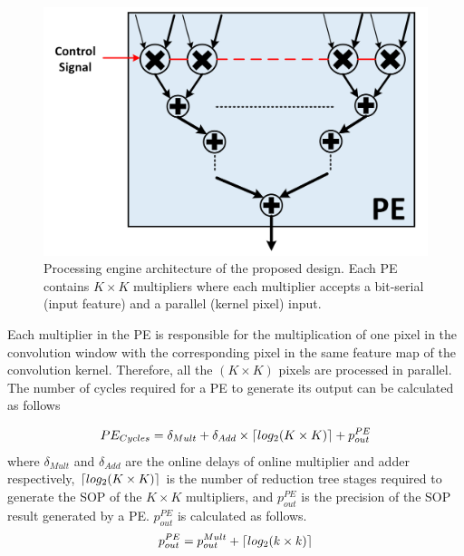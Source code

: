 \documentclass[conference]{IEEEtran}
\DeclarePairedDelimiter{\ceil}{\lceil}{\rceil}
\begin{document}
\begin{figure}[!htb]
    \centering
    \includegraphics[width=0.9\linewidth]{PE.png}
    \caption{Processing engine architecture of the proposed design. Each PE contains $K\times K$ multipliers where each multiplier accepts a bit-serial (input feature) and a parallel (kernel pixel) input.}
    \label{fig:PE}
\end{figure}


 
Each multiplier in the PE is responsible for the multiplication of one pixel in the convolution window with the corresponding pixel in the same feature map of the convolution kernel. Therefore, all the $(K \times K)$ pixels are processed in parallel. The number of cycles required for a PE to generate its output can be calculated as follows

\begin{equation} \label{eq: num_cycles}
        PE_{Cycles} = \delta_{Mult} + \delta_{Add} \times \ceil{log_{2}(K \times K)} + p^{PE}_{out}
\end{equation}
where $\delta_{Mult}$ and $\delta_{Add}$ are the online delays of online multiplier and adder respectively, $\ceil{log_{2}(K \times K)}$ is the number of reduction tree stages required to generate the SOP of the $K \times K$ multipliers, 
and $p^{PE}_{out}$ is the precision of the SOP result generated by a PE. $p^{PE}_{out}$ is calculated as follows.
\begin{equation} \label{eq:pout}
     p^{PE}_{out} = p_{out}^{Mult} + \ceil{log_{2}(k \times k)}
\end{equation}
\end{document}

